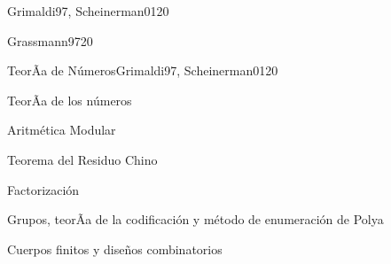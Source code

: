 \begin{syllabus}
\begin{unit}{\ALNUEVEDef}{Grimaldi97, Scheinerman01}{20}
   \begin{topics}
         \item  \ALNUEVEDef
         \item  \ALNUEVETopicRevision
         \item  \ALNUEVETopicCriptografia
        \item   \ALNUEVETopicCriptografiade
        \item   \ALNUEVETopicFirmas
        \item   \ALNUEVETopicProtocolos
        \item   \ALNUEVETopicAplicaciones
   \end{topics}

   \begin{unitgoals}
         \item \ALNUEVEObjONE
         \item \ALNUEVEObjTWO
          \item \ALNUEVEObjTHREE
   \end{unitgoals}
\end{unit}

\begin{unit}{\IMFOURDef}{Grassmann97}{20}
   \begin{topics}
         \item \IMFOURDef
         \item \IMFOURTopicMapeo
         \item \IMFOURTopicEntidad
         \item \IMFOURTopicAlgebra
   \end{topics}

   \begin{unitgoals}
         \item \IMFOURObjONE
         \item \IMFOURObjTWO
         \item \IMFOURObjTHREE
         \item \IMFOURObjFOUR
         \item \IMFOURObjCINCO
   \end{unitgoals}
\end{unit}

\begin{unit}{TeorÃ­a de Números}{Grimaldi97, Scheinerman01}{20}
   \begin{topics}
      \item TeorÃ­a de los números
     \item Aritmética  Modular
      \item Teorema del Residuo Chino
       \item Factorización
      \item Grupos, teorÃ­a de la codificación y método de enumeración de Polya
      \item Cuerpos finitos y diseños combinatorios
   \end{topics}


\end{unit}
\end{syllabus}
